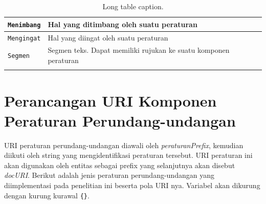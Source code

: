 \begin{longtable}[l]{|p{}|p{}|}
  \texttt{Menimbang}      & Hal yang ditimbang oleh suatu peraturan                                                         \\ \hline
  \texttt{Mengingat}      & Hal yang diingat oleh suatu peraturan                                                           \\ \hline
  \texttt{Segmen}         & Segmen teks. Dapat memiliki rujukan ke suatu komponen peraturan                                 \\ \hline
  \caption{Long table caption.\label{longsz}}                                                                                                  \\
\end{longtable}

\section{Perancangan URI Komponen Peraturan
  Perundang-undangan}\label{perancangan-uri-komponen-peraturan-perundang-undangan}

URI peraturan perundang-undangan diawali oleh \textit{peraturanPrefix}, kemudian diikuti oleh string
yang mengidentifikasi peraturan tersebut. URI peraturan ini akan digunakan oleh entitas sebagai
prefix yang selanjutnya akan disebut \textit{docURI}. Berikut adalah jenis peraturan
perundang-undangan yang diimplementasi pada penelitian ini beserta pola URI nya. Variabel akan
dikurung dengan kurung kurawal \texttt{\{\}}.




